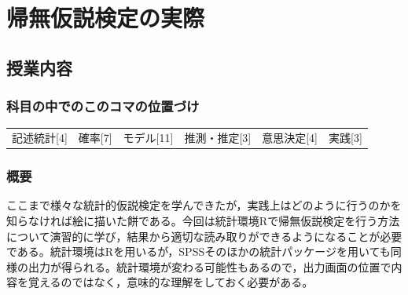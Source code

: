 \section{帰無仮説検定の実際}
\label{D1_lesson20}

\subsection{授業内容}
\subsubsection{科目の中でのこのコマの位置づけ}
\begin{tabular}[t]{cccccc}
    記述統計[4] & 確率[7] & モデル[11] & 推測・推定[3] & 意思決定[4] & 実践[3]
\end{tabular}

\subsubsection{概要}
ここまで様々な統計的仮説検定を学んできたが，実践上はどのように行うのかを知らなければ絵に描いた餅である。今回は統計環境Rで帰無仮説検定を行う方法について演習的に学び，結果から適切な読み取りができるようになることが必要である。統計環境はRを用いるが，SPSSそのほかの統計パッケージを用いても同様の出力が得られる。統計環境が変わる可能性もあるので，出力画面の位置で内容を覚えるのではなく，意味的な理解をしておく必要がある。
